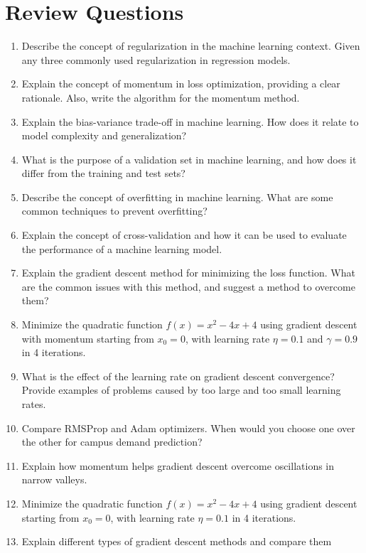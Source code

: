 \documentclass[
  letterpaper,
  DIV=11,
  numbers=noendperiod]{scrreprt}
\providecommand{\tightlist}{%
  \setlength{\itemsep}{0pt}\setlength{\parskip}{0pt}}
\begin{document}
\section{Review Questions}\label{review-questions-20}

\begin{enumerate}
\def\labelenumi{\arabic{enumi}.}
\tightlist
\item
  Describe the concept of regularization in the machine learning
  context. Given any three commonly used regularization in regression
  models.
\item
  Explain the concept of momentum in loss optimization, providing a
  clear rationale. Also, write the algorithm for the momentum method.
\item
  Explain the bias-variance trade-off in machine learning. How does it
  relate to model complexity and generalization?
\item
  What is the purpose of a validation set in machine learning, and how
  does it differ from the training and test sets?
\item
  Describe the concept of overfitting in machine learning. What are some
  common techniques to prevent overfitting?
\item
  Explain the concept of cross-validation and how it can be used to
  evaluate the performance of a machine learning model.
\item
  Explain the gradient descent method for minimizing the loss function.
  What are the common issues with this method, and suggest a method to
  overcome them?
\item
  Minimize the quadratic function \(f(x)= x^2- 4x + 4\) using gradient
  descent with momentum starting from \(x_0= 0\), with learning rate
  \(\eta = 0.1\) and \(\gamma=0.9\) in 4 iterations.
\item
  What is the effect of the learning rate on gradient descent
  convergence? Provide examples of problems caused by too large and too
  small learning rates.
\item
  Compare RMSProp and Adam optimizers. When would you choose one over
  the other for campus demand prediction?
\item
  Explain how momentum helps gradient descent overcome oscillations in
  narrow valleys.
\item
  Minimize the quadratic function \(f(x)= x^2- 4x + 4\) using gradient
  descent starting from \(x_0= 0\), with learning rate \(\eta = 0.1\) in
  4 iterations.
\item
  Explain different types of gradient descent methods and compare them

\end{enumerate}
\end{document}
